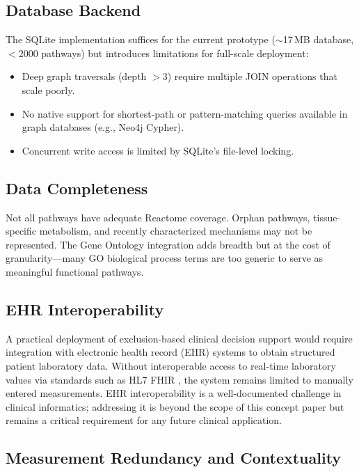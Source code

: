 \documentclass[12pt,a4paper]{article}
\begin{document}
\subsection{Database Backend}

The SQLite implementation suffices for the current prototype ($\sim$17\,MB database, $<$2000 pathways) but introduces limitations for full-scale deployment:

\begin{itemize}
    \item Deep graph traversals (depth $>3$) require multiple JOIN operations that scale poorly.
    \item No native support for shortest-path or pattern-matching queries available in graph databases (e.g., Neo4j Cypher).
    \item Concurrent write access is limited by SQLite's file-level locking.
\end{itemize}

\subsection{Data Completeness}

Not all pathways have adequate Reactome coverage. Orphan pathways, tissue-specific metabolism, and recently characterized mechanisms may not be represented. The Gene Ontology integration adds breadth but at the cost of granularity---many GO biological process terms are too generic to serve as meaningful functional pathways.

\subsection{EHR Interoperability}

A practical deployment of exclusion-based clinical decision support would require integration with electronic health record (EHR) systems to obtain structured patient laboratory data. Without interoperable access to real-time laboratory values via standards such as HL7 FHIR \citep{HL7FHIR2023}, the system remains limited to manually entered measurements. EHR interoperability is a well-documented challenge in clinical informatics; addressing it is beyond the scope of this concept paper but remains a critical requirement for any future clinical application.

\subsection{Measurement Redundancy and Contextuality}
\end{document}
